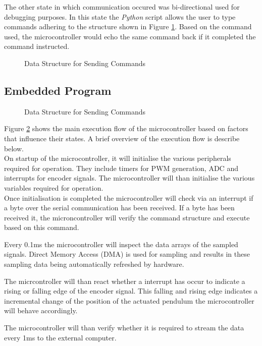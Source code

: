 The other state in which communication occured was bi-directional used for debugging purposes. In this state the \textit{Python} script allows the user to type commands adhering to the structure shown in Figure \ref{fig:uart_struct}. Based on the command used, the microcontroller would echo the same command back if it completed the command instructed.


\begin{figure}[h]
	\centering
	
	\caption{Data Structure for Sending Commands}
	\label{fig:uart_struct}
\end{figure}


\subsection{Embedded Program}
\begin{figure}[h]
	\centering
	
	\caption{Data Structure for Sending Commands}
	\label{fig:software_flow}
\end{figure}

Figure \ref{fig:software_flow} shows the main execution flow of the microcontroller based on factors that influence their states. A brief overview of the execution flow is describe below.\\

On startup of the microcontroller, it will initialise the various peripherals required for operation. They include timers for PWM generation, ADC and interrupts for encoder signals. The microcontroller will than initialise the various variables required for operation.\\

Once initialisation is completed the microcontroller will check via an interrupt if a byte over the serial communication has been received. If a byte has been received it, the microncontroller will verify the command structure and execute based on this command.

Every 0.1ms the microcontroller will inspect the data arrays of the sampled signals. Direct Memory Access (DMA) is used for sampling and results in these sampling data being automatically refreshed by hardware.

The micrcontroller will than react whether a interrupt has occur to indicate a rising or falling edge of the encoder signal. This falling and rising edge indicates a incremental change of the position of the actuated pendulum the microcontroller will behave accordingly.

The microcontroller will than verify whether it is required to stream the data every 1ms to the external computer. 
